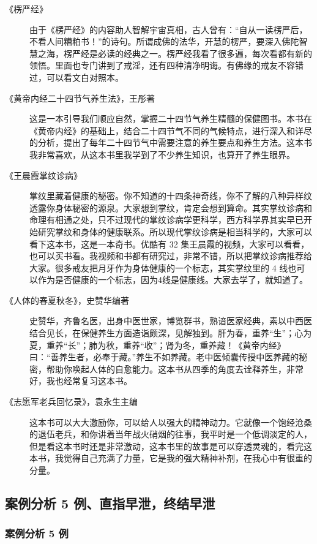 \documentclass{ctexart}
\begin{document}
\begin{description}
    \item[《楞严经》] 由于《楞严经》的内容助人智解宇宙真相，古人曾有：“自从一读楞严后，不看人间糟粕书！”的诗句。所谓成佛的法华，开慧的楞严，要深入佛陀智慧之海，楞严经是必读的经典之一。楞严经我看了很多遍，每次看都有新的领悟。里面也专门讲到了戒淫，还有四种清净明诲。有佛缘的戒友不容错过，可以看文白对照本。
    \item[《黄帝内经二十四节气养生法》，王彤著] 这是一本引导我们顺应自然，掌握二十四节气养生精髓的保健图书。本书在《黄帝内经》的基础上，结合二十四节气不同的气候特点，进行深入和详尽的分析，提出了每年二十四节气中需要注意的养生要点和养生方法。这本书我非常喜欢，从这本书里我学到了不少养生知识，也算开了养生眼界。
    \item[《王晨霞掌纹诊病》] 掌纹里藏着健康的秘密。你不知道的十四条神奇线，你不了解的八种异样纹透露你身体秘密的源泉。大家想到掌纹，肯定会想到算命。其实掌纹诊病和命理有相通之处，只不过现代的掌纹诊病学更科学，西方科学界其实早已开始研究掌纹和身体的健康联系。所以现代掌纹诊病是相当科学的，大家可以看下这本书，这是一本奇书。优酷有 32 集王晨霞的视频，大家可以看看，也可以买书看。我视频和书都有研究过，非常不错，所以把掌纹诊病推荐给大家。很多戒友把月牙作为身体健康的一个标志，其实掌纹里的 4 线也可以作为是否健康的一个标志，因为4线是健康线。大家去学了，就知道了。
    \item[《人体的春夏秋冬》，史赞华编著] 史赞华，齐鲁名医，出身中医世家，博览群书，熟谙医家经典，素以中西医结合见长，在保健养生方面造诣颇深，见解独到。肝为春，重养“生”；心为夏，重养“长”；肺为秋，重养“收”；肾为冬，重养藏！《黄帝内经》曰：“善养生者，必奉于藏。”养生不如养藏。老中医倾囊传授中医养藏的秘密，帮助你唤起人体的自愈能力。这本书从四季的角度去诠释养生，非常好，我也经常复习这本书。
    \item[《志愿军老兵回忆录》，袁永生主编] 这本书可以大大激励你，可以给人以强大的精神动力。它就像一个饱经沧桑的退伍老兵，和你讲着当年战火硝烟的往事，我平时是一个低调淡定的人，但是看这本书时还是非常激动，这本书里的故事是可以穿透灵魂的，看完这本书，我觉得自己充满了力量，它是我的强大精神补剂，在我心中有很重的分量。
\end{description}

\subsection{案例分析 5 例、直指早泄，终结早泄}

\subsubsection{案例分析 5 例}
\end{document}
